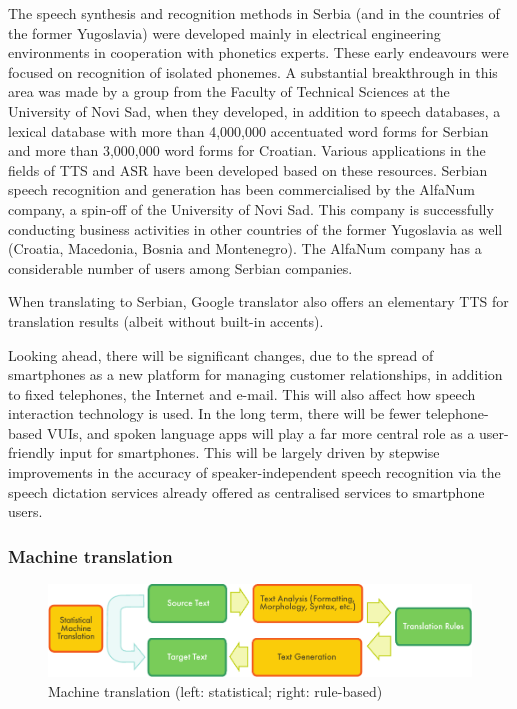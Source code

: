 {\begin{multicols}{2}
The speech synthesis and recognition methods in Serbia (and in the countries of the former Yugoslavia) were developed mainly in electrical engineering environments in cooperation with phonetics experts. These early endeavours were focused on recognition of isolated phonemes. A substantial breakthrough in this area was made by a group from the Faculty of Technical Sciences at the University of Novi Sad, when they developed, in addition to speech databases, a lexical database with more than 4,000,000 accentuated word forms for Serbian and more than 3,000,000 word forms for Croatian. Various applications in the fields of TTS and ASR have been developed based on these resources. Serbian speech recognition and generation has been commercialised by the AlfaNum company, a spin-off of the University of Novi Sad. This company is successfully conducting business activities in other countries of the former Yugoslavia as well (Croatia, Macedonia, Bosnia and Montenegro). The AlfaNum company has a considerable number of users among Serbian companies. 

When translating to Serbian, Google translator also offers an elementary TTS for translation results (albeit without built-in accents).


Looking ahead, there will be significant changes, due to the spread of smartphones as a new platform for managing customer relationships, in addition to fixed telephones, the Internet and e-mail. This will also affect how speech interaction technology is used. In the long term, there will be fewer telephone-based VUIs, and spoken language apps will play a far more central role as a user-friendly input for smartphones. This will be largely driven by stepwise improvements in the accuracy of speaker-independent speech recognition via the speech dictation services already offered as centralised services to smartphone users.

 \subsubsection {Machine translation}

\begin{figure}[htb]
  \center
  \includegraphics[width=\textwidth]{../_media/english/machine_translation}
  \caption{Machine translation (left: statistical; right: rule-based)}
  \label{fig:mtarch_en}
\end{figure}
 



\end{multicols}}
